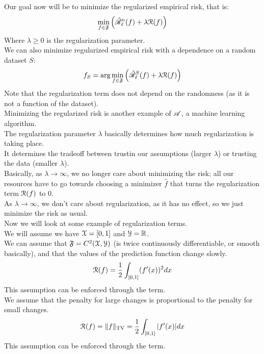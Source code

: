 \documentclass[12pt]{article}
\begin{document}
Our goal now will be to minimize the regularized
empirical risk, that is:
\[ \min_{f \in \mathfrak{F}} \left(  
\hat{\mathscr{R}}_{\ell}^{n}(f) + \lambda\mathcal{R}(f) \right) \]
Where $\lambda \geq 0$ is the regularization
parameter. \\

We can also minimize regularized empirical
risk with a dependence on a random dataset $S$:
\[ f_S = \arg\min_{f \in \mathfrak{F}} \left(  
\hat{\mathscr{R}}_{\ell}^{S}(f) + \lambda\mathcal{R}(f) \right) \]
Note that the regularization term does not
depend on the randomness (as it is not a function
of the dataset). \\

Minimizing the regularized risk is another
example of $\mathscr{A}$, a machine learning
algorithm. \\

The regularization parameter $\lambda$
basically determines how much regularization
is taking place. \\
It determines the tradeoff between trustin
our assumptions (larger $\lambda$)
or trusting the data (smaller $\lambda$). \\

Basically, as $\lambda \to \infty$,
we no longer care about minimizing the risk;
all our resources have to go towards choosing
a minimizer $\hat{f}$ that turns the
regularization term $\mathcal{R}(f)$ to $0$. \\
As $\lambda \to \infty$,
we don't care about regularization,
as it has no effect, so we just minimize the risk
as usual. \\

Now we will look at some example of regularization
terms. \\
We will assume we have $\mathcal{X} = [0, 1]$ and
$\mathcal{Y} = \mathbb{R}$. \\

We can assume that $\mathfrak{F} = C^2(\mathcal{X}, \mathcal{Y})$
(is twice continuously differentiable,
or smooth basically),
and that the values of the prediction function
change slowly. \\
\[ \mathcal{R}(f) = \dfrac{1}{2}\int_{[0, 1]} 
(f'(x))^2 dx \]
This assumption can be enforced through the term. \\

We assume that the penalty for large 
changes is proportional to the penalty for
small changes. \\
\[ \mathcal{R}(f) = \|f\|_{\text{TV}} 
= \dfrac{1}{2}\int_{[0, 1]} |f'(x)| dx \]
This assumption can be enforced through the term. \\
\end{document}
